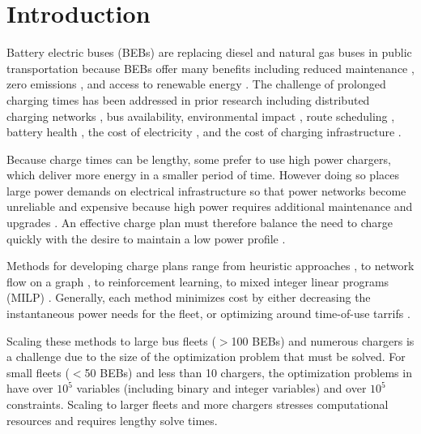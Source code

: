 \section{Introduction} 
\par Battery electric buses (BEBs) are replacing diesel and natural gas buses in public transportation because BEBs offer many benefits \cite{Mahmoud2016} including reduced maintenance \cite{poornesh_comparative_2020}, zero emissions \cite{kato_comparative_2013}, and access to renewable energy \cite{cheng_smart_2020}.  The challenge of prolonged charging times has been addressed in prior research including distributed charging networks \cite{Nimalsiri2020}, bus availability, environmental impact \cite{zhou_bi-objective_2021}, route scheduling \cite{Rinalde_Mixed_2020}, battery health \cite{houbbadi_optimal_2019}, the cost of electricity \cite{Leou_optimal_2017}, and the cost of charging infrastructure \cite{Wei2018}.  
\par Because charge times can be lengthy, some prefer to use high power chargers, which deliver more energy in a smaller period of time. However doing so places large power demands on electrical infrastructure \cite{stahleder_impact_2019} so that power networks become unreliable \cite{deb_impact_2017} and expensive because high power requires additional maintenance and upgrades \cite{boonraksa_impact_2019}. An effective charge plan must therefore balance the need to charge quickly with the desire to maintain a low power profile \cite{ojer_development_2020}.  
\par Methods for developing charge plans range from heuristic approaches \cite{qin_numerical_2016}, to network flow on a graph \cite{whitaker_network_2023}, to reinforcement learning\cite{Wang2019}, to mixed integer linear programs (MILP) \cite{bagherinezhad_spatio-temporal_2020}. Generally, each method minimizes cost by either decreasing the instantaneous power needs for the fleet, or optimizing around time-of-use tarrifs \cite{He_2019_Fast}.  
\par Scaling these methods to large bus fleets ($>$100 BEBs) and numerous chargers is a challenge due to the size of the optimization problem that must be solved.  For small fleets ($<$50 BEBs) and less than 10 chargers, the optimization problems in \cite{whitaker_network_2023,bagherinezhad_spatio-temporal_2020,He_2019_Fast} have over $10^5$ variables (including binary and integer variables) and over $10^5$ constraints.  Scaling to larger fleets and more chargers stresses computational resources and requires lengthy solve times.  
